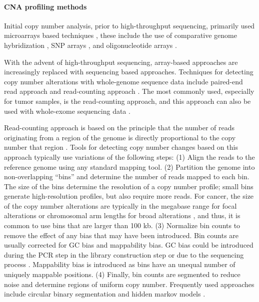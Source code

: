 \paragraph{CNA profiling methods}
Initial copy number analysis, prior to high-throughput sequencing,
primarily used microarrays based techniques \citep{carter2007methods},
these include the use of comparative genome hybridization
\citep{pinkel1998high}, SNP arrays \citep{nannya2005robust}, and
oligonucleotide arrays \citep{lucito2003representational}.

With the advent of high-throughput sequencing, array-based approaches
are increasingly replaced with sequencing based approaches.  Techniques
for detecting copy number alterations with whole-genome sequence data
include paired-end read approach \citep{korbel2007paired,
campbell2008identification} and read-counting approach
\citep{yoon2009sensitive}.  The most commonly used, especially for tumor
samples, is the read-counting approach, and this approach can also be
used with whole-exome sequencing data \citep{krumm2012copy,d2016enhanced}.

Read-counting approach is based on the principle that the number of
reads originating from a region of the genome is directly proportional
to the copy number that region \citep{baslan2015optimizing}.
%
Tools for detecting copy number changes based on this approach typically
use variations of the following steps:
%
(1) Align the reads to the reference genome using any standard mapping
tool.
%
(2) Partition the genome into non-overlapping ``bins'' and determine
the number of reads mapped to each bin. The size of the bins determine
the resolution of a copy number profile; small bins generate
high-resolution profiles, but also require more reads. For cancer, the
size of the copy number alterations are typically in the megabase
range for focal alterations or chromosomal arm lengths for broad
alterations \citep{beroukhim2010landscape}, and thus, it is common to
use bins that are larger than 100 kb.
%
(3) Normalize bin counts to remove the effect of any bias that may have
been introduced. Bin counts are usually corrected for GC bias and
mappability bias. GC bias could be introduced during the PCR step in the
library construction step or due to the sequencing process
\citep{aird2011analyzing,benjamini2012summarizing}. Mappability bias is
introduced as bins have an unequal number of uniquely mappable positions.
%
(4) Finally, bin counts are segmented to reduce noise and determine
regions of uniform copy number. Frequently used approaches include
circular binary segmentation
\citep{olshen2004circular,venkatraman2007faster} and hidden markov
models \citep{ha2014titan}.

